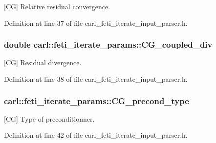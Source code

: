 \mbox{[}C\+G\mbox{]} Relative residual convergence. 



Definition at line 37 of file carl\+\_\+feti\+\_\+iterate\+\_\+input\+\_\+parser.\+h.

\hypertarget{structcarl_1_1feti__iterate__params_aa6c49632bdf6096cdc8d6e960d269484}{}
\subsubsection[{C\+G\+\_\+coupled\+\_\+div}]{\setlength{\rightskip}{0pt plus 5cm}double carl\+::feti\+\_\+iterate\+\_\+params\+::\+C\+G\+\_\+coupled\+\_\+div}\label{structcarl_1_1feti__iterate__params_aa6c49632bdf6096cdc8d6e960d269484}


\mbox{[}C\+G\mbox{]} Residual divergence. 



Definition at line 38 of file carl\+\_\+feti\+\_\+iterate\+\_\+input\+\_\+parser.\+h.

\hypertarget{structcarl_1_1feti__iterate__params_ac48e02bc42d7a5e3f3a0f70418fbae10}{}
\subsubsection[{C\+G\+\_\+precond\+\_\+type}]{ carl\+::feti\+\_\+iterate\+\_\+params\+::\+C\+G\+\_\+precond\+\_\+type}\label{structcarl_1_1feti__iterate__params_ac48e02bc42d7a5e3f3a0f70418fbae10}


\mbox{[}C\+G\mbox{]} Type of preconditionner. 



Definition at line 42 of file carl\+\_\+feti\+\_\+iterate\+\_\+input\+\_\+parser.\+h.

\hypertarget{structcarl_1_1feti__iterate__params_a198b85f203c17fa0f5973f9c2ced2110}{}
